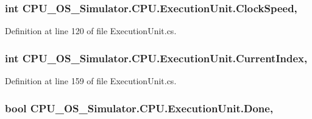 \subsubsection[{Clock\+Speed}]{\setlength{\rightskip}{0pt plus 5cm}int C\+P\+U\+\_\+\+O\+S\+\_\+\+Simulator.\+C\+P\+U.\+Execution\+Unit.\+Clock\+Speed\hspace{0.3cm}{\ttfamily [get]}, {\ttfamily [set]}}\label{class_c_p_u___o_s___simulator_1_1_c_p_u_1_1_execution_unit_ac34a0c232ee8d1996d29f5d8614556ab}


Definition at line 120 of file Execution\+Unit.\+cs.

\hypertarget{class_c_p_u___o_s___simulator_1_1_c_p_u_1_1_execution_unit_a14d2a23bdc679ed2758733f34f79db63}{}
\subsubsection[{Current\+Index}]{\setlength{\rightskip}{0pt plus 5cm}int C\+P\+U\+\_\+\+O\+S\+\_\+\+Simulator.\+C\+P\+U.\+Execution\+Unit.\+Current\+Index\hspace{0.3cm}{\ttfamily [get]}, {\ttfamily [set]}}\label{class_c_p_u___o_s___simulator_1_1_c_p_u_1_1_execution_unit_a14d2a23bdc679ed2758733f34f79db63}


Definition at line 159 of file Execution\+Unit.\+cs.

\hypertarget{class_c_p_u___o_s___simulator_1_1_c_p_u_1_1_execution_unit_afc47977290c9bccf4f3b115613a67576}{}
\subsubsection[{Done}]{\setlength{\rightskip}{0pt plus 5cm}bool C\+P\+U\+\_\+\+O\+S\+\_\+\+Simulator.\+C\+P\+U.\+Execution\+Unit.\+Done\hspace{0.3cm}{\ttfamily [get]}, {\ttfamily [set]}}\label{class_c_p_u___o_s___simulator_1_1_c_p_u_1_1_execution_unit_afc47977290c9bccf4f3b115613a67576}


